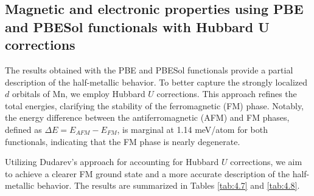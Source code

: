 \subsection{Magnetic and electronic properties using PBE and PBESol functionals with Hubbard U corrections}

The results obtained with the PBE and PBESol functionals provide a partial description of the half-metallic behavior. To better capture the strongly localized $d$ orbitals of Mn, we employ Hubbard $U$ corrections. This approach refines the total energies, clarifying the stability of the ferromagnetic (FM) phase. Notably, the energy difference between the antiferromagnetic (AFM) and FM phases, defined as $\Delta E = E_{AFM} - E_{FM}$, is marginal at 1.14 meV/atom for both functionals, indicating that the FM phase is nearly degenerate.

Utilizing Dudarev's approach for accounting for Hubbard $U$ corrections, we aim to achieve a clearer FM ground state and a more accurate description of the half-metallic behavior. The results are summarized in Tables \ref{tab:4.7} and \ref{tab:4.8}.


